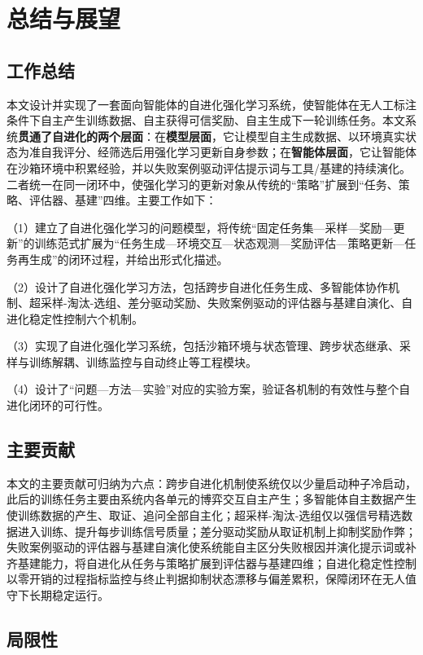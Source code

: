 \chapter{总结与展望}

\section{工作总结}

本文设计并实现了一套面向智能体的自进化强化学习系统，使智能体在无人工标注条件下自主产生训练数据、自主获得可信奖励、自主生成下一轮训练任务。本文系统\textbf{贯通了自进化的两个层面}：在\textbf{模型层面}，它让模型自主生成数据、以环境真实状态为准自我评分、经筛选后用强化学习更新自身参数；在\textbf{智能体层面}，它让智能体在沙箱环境中积累经验，并以失败案例驱动评估提示词与工具/基建的持续演化。二者统一在同一闭环中，使强化学习的更新对象从传统的“策略”扩展到“任务、策略、评估器、基建”四维。主要工作如下：

（1）建立了自进化强化学习的问题模型，将传统“固定任务集—采样—奖励—更新”的训练范式扩展为“任务生成—环境交互—状态观测—奖励评估—策略更新—任务再生成”的闭环过程，并给出形式化描述。

（2）设计了自进化强化学习方法，包括跨步自进化任务生成、多智能体协作机制、超采样-淘汰-选组、差分驱动奖励、失败案例驱动的评估器与基建自演化、自进化稳定性控制六个机制。

（3）实现了自进化强化学习系统，包括沙箱环境与状态管理、跨步状态继承、采样与训练解耦、训练监控与自动终止等工程模块。

（4）设计了“问题—方法—实验”对应的实验方案，验证各机制的有效性与整个自进化闭环的可行性。

\section{主要贡献}

本文的主要贡献可归纳为六点：跨步自进化机制使系统仅以少量启动种子冷启动，此后的训练任务主要由系统内各单元的博弈交互自主产生；多智能体自主数据产生使训练数据的产生、取证、追问全部自主化；超采样-淘汰-选组仅以强信号精选数据进入训练、提升每步训练信号质量；差分驱动奖励从取证机制上抑制奖励作弊；失败案例驱动的评估器与基建自演化使系统能自主区分失败根因并演化提示词或补齐基建能力，将自进化从任务与策略扩展到评估器与基建四维；自进化稳定性控制以零开销的过程指标监控与终止判据抑制状态漂移与偏差累积，保障闭环在无人值守下长期稳定运行。

\section{局限性}


